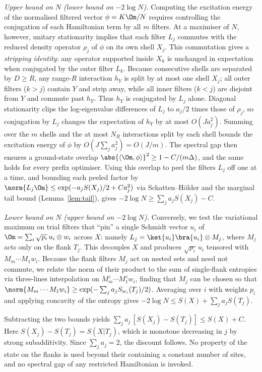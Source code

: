 \begin{inwords}
\emph{Upper bound on $N$ (lower bound on $-2\log N$).} Computing the
excitation energy of the normalised filtered vector $\phi=K\Om/N$ requires
controlling the conjugation of each Hamiltonian term by all $m$ filters.
At a maximiser of $N$, however, unitary stationarity implies that each
filter $L_j$ commutes with the reduced density operator $\rho_j$ of $\phi$
on its own shell $X_j$. This commutation gives a \emph{stripping
identity}: any operator supported inside $X_k$ is unchanged in expectation
when conjugated by the outer filter $L_k$. Because consecutive shells are
separated by $D\ge R$, any range-$R$ interaction $h_Y$ is split by at most
one shell $X_j$; all outer filters ($k>j$) contain $Y$ and strip away,
while all inner filters ($k<j$) are disjoint from $Y$ and commute past
$h_Y$. Thus $h_Y$ is conjugated by $L_j$ alone. Diagonal stationarity clips
the log-eigenvalue differences of $L_j$ to $a_j/2$ times those of $\rho_j$,
so conjugation by $L_j$ changes the expectation of $h_Y$ by at most
$O(Ja_j^2)$. Summing over the $m$ shells and the at most $N_R$ interactions
split by each shell bounds the excitation energy of $\phi$ by
$O(J\sum_j a_j^2)=O(J/m)$. The spectral gap then ensures a ground-state
overlap $\abs{\langle\Om,\phi\rangle}^2\ge 1-C/(m\Delta)$, and the same
holds for every prefix optimiser. Using this overlap to peel the filters
$L_j$ off one at a time, and bounding each peeled factor by
$\norm{L_j\Om}\le\exp(-a_jS(X_j)/2+Ca_j^2)$ via Schatten--Hölder and the
marginal tail bound (Lemma~\ref{lem:tail}), gives
$-2\log N\ge\sum_ja_jS(X_j)-C$.

\emph{Lower bound on $N$ (upper bound on $-2\log N$).} Conversely, we test
the variational maximum on trial filters that ``pin'' a single Schmidt
vector $u_i$ of $\Om=\sum_i\sqrt{p_i}\,u_i\otimes w_i$ across $X$: namely
$L_j=\ket{u_i}\bra{u_i}\otimes M_j$, where $M_j$ acts only on the flank
$T_j$. This decouples $X$ and produces $\sqrt{p_i}\,u_i$ tensored with
$M_m\cdots M_1w_i$. Because the flank filters $M_j$ act on nested sets and
need not commute, we relate the norm of their product to the sum of single-flank
entropies via three-lines interpolation on $M_m^z\cdots M_1^zw_i$, finding
that $M_j$ can be chosen so that
$\norm{M_m\cdots M_1w_i}\ge\exp(-\sum_ja_jS_{w_i}(T_j)/2)$. Averaging over
$i$ with weights $p_i$ and applying concavity of the entropy gives
$-2\log N\le S(X)+\sum_ja_jS(T_j)$.

Subtracting the two bounds yields $\sum_ja_j\,[S(X_j)-S(T_j)]\le S(X)+C$.
Here $S(X_j)-S(T_j)=S(X|T_j)$, which is monotone decreasing in $j$ by
strong subadditivity. Since $\sum_ja_j=2$, the discount follows. No
property of the state on the flanks is used beyond their containing a
constant number of sites, and no spectral gap of any restricted
Hamiltonian is invoked.
\end{inwords}

